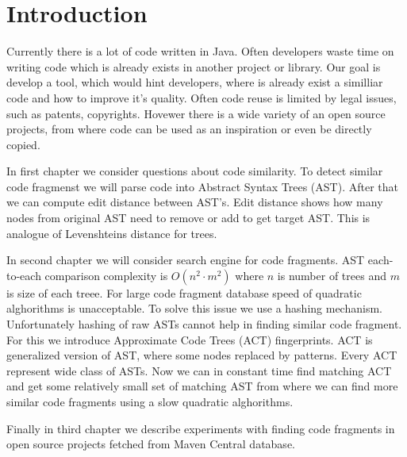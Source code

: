 \section*{Introduction}
Currently there is a lot of code written in Java. Often developers waste time on
writing code which is already exists in another project or library. Our goal is
develop a tool, which would hint developers, where is already exist a similliar
code and how to improve it's quality. Often code reuse is limited by legal
issues, such as patents, copyrights. Hovewer there is a wide variety of an open source
projects, from where code can be used as an inspiration or even be directly
copied.

In first chapter we consider questions about code similarity. To detect similar
code fragmenst we will parse code into Abstract Syntax Trees (AST). After that
we can compute edit distance between AST's. Edit distance shows how many nodes
from original AST need to remove or add to get target AST. This is analogue of
Levenshteins distance for trees.

In second chapter we will consider search engine for code fragments. AST
each-to-each comparison complexity is $O(n^2 \cdot m^2)$ where $n$ is number of
trees and $m$ is size of each treee. For large code fragment database speed of
quadratic alghorithms is unacceptable. To solve this issue we use a
hashing mechanism. Unfortunately hashing of raw ASTs cannot help in finding similar code
fragment. For this we introduce Approximate Code Trees (ACT) fingerprints.
ACT is generalized version of AST, where some nodes replaced by patterns. Every ACT
represent wide class of ASTs. Now we can in constant time find matching ACT and
get some relatively small set of matching AST from where we can find more
similar code fragments using a slow quadratic alghorithms.

Finally in third chapter we describe experiments with finding code fragments in
open source projects fetched from Maven Central database.
